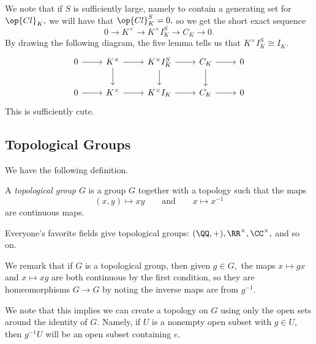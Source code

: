 \documentclass[../notes.tex]{subfiles}
\begin{document}
We note that if $S$ is sufficiently large, namely to contain a generating set for $\op{Cl}_K,$ we will have that $\op{Cl}_K^S=0,$ so we get the short exact sequence
\[0\to K^\times\to K^\times I_K^S\to C_K\to0.\]
By drawing the following diagram, the five lemma tells us that $K^\times I_K^S\cong I_K.$
\[\begin{tikzcd}
	0 & {K^\times} & {K^\times I_K^S} & {C_K} & 0 \\
	0 & {K^\times} & {K^\times I_K} & {C_K} & 0
	\arrow[from=1-1, to=1-2]
	\arrow[from=1-2, to=1-3]
	\arrow[from=1-3, to=1-4]
	\arrow[from=1-4, to=1-5]
	\arrow[from=2-1, to=2-2]
	\arrow[from=2-2, to=2-3]
	\arrow[from=2-3, to=2-4]
	\arrow[from=2-4, to=2-5]
	\arrow[from=1-2, to=2-2]
	\arrow[from=1-3, to=2-3]
	\arrow[from=1-4, to=2-4]
\end{tikzcd}\]
This is sufficiently cute.

\subsection{Topological Groups}
We have the following definition.
\begin{definition}
	A \textit{topological group} $G$ is a group $G$ together with a topology such that the maps
	\[(x,y)\mapsto xy\qquad\text{and}\qquad x\mapsto x^{-1}\]
	are continuous maps.
\end{definition}
\begin{example}
	Everyone's favorite fields give topological groups: $(\QQ,+),\RR^\times,\CC^\times,$ and so on.
\end{example}
We remark that if $G$ is a topological group, then given $g\in G,$ the maps $x\mapsto gx$ and $x\mapsto xg$ are both continuous by the first condition, so they are homeomorphisms $G\to G$ by noting the inverse maps are from $g^{-1}.$

We note that this implies we can create a topology on $G$ using only the open sets around the identity of $G.$ Namely, if $U$ is a nonempty open subset with $g\in U,$ then $g^{-1}U$ will be an open subset containing $e.$
\end{document}
